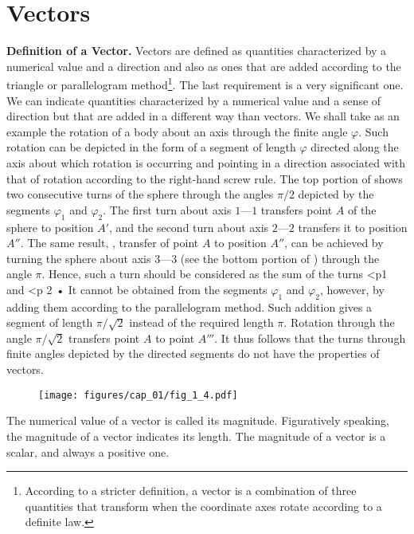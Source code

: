 \section{Vectors}\label{sec:1_2}

\textbf{Definition of a Vector.} Vectors are defined as quantities characterized by a numerical value and a direction and also as ones that are added according to the triangle or parallelogram method\footnote{According to a stricter definition, a vector is a combination of three quantities that transform when the coordinate axes rotate according to a definite law.}. The last requirement is a very significant one. We can indicate quantities characterized by a numerical value and a sense of direction but that are added in a different way than vectors. We shall take as an example the rotation of a body about an axis through the finite angle $\varphi$. Such rotation can be depicted in the form of a segment of length $\varphi$ directed along the axis about which rotation is occurring and pointing in a direction associated with that of rotation according to the right-hand screw rule. The top portion of  shows two consecutive turns of the sphere through the angles $\pi/2$ depicted by the segments $\varphi_1$ and $\varphi_2$. The first turn about axis $1$---$1$ transfers point $A$ of the sphere to position $A'$, and the second turn about axis $2$---$2$ transfers it to position $A''$. The same result, \ie, transfer of point $A$ to position $A''$, can be achieved by turning the sphere about axis $3$---$3$ (see the bottom portion of ) through the angle $\pi$. Hence, such a turn should be considered as the sum of the turns <p1 and <p 2 • It cannot be obtained from the segments $\varphi_1$ and $\varphi_2$, however, by adding them according to the parallelogram method. Such addition gives a segment of length $\pi/\sqrt{2}$ instead of the required length $\pi$. Rotation through the angle $\pi/\sqrt{2}$ transfers point $A$ to point $A'''$. It thus follows that the turns through finite angles depicted by the directed segments do not have the properties of vectors.

\begin{figure}[t]
	\begin{center}
		\texttt{[image: figures/cap\_01/fig\_1\_4.pdf]}
		\caption[]{}
		\label{fig:1_4}
	\end{center}
\vspace{-0.8cm}
\end{figure}

The numerical value of a vector is called its magnitude. Figuratively speaking, the magnitude of a vector indicates its length. The magnitude of a vector is a scalar, and always a positive one.

